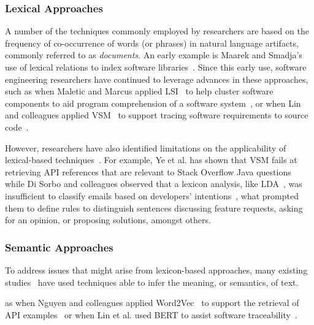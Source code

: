 \subsubsection{Lexical Approaches}


A number of the techniques commonly employed by researchers are based on the
frequency of co-occurrence of words (or phrases) in natural language artifacts, commonly referred to as \textit{documents}. 
An early example is Maarek and Smadja's use of lexical relations to index
software libraries~\cite{maarek1989}. 
Since this early use, software engineering
researchers have continued to leverage advances in
these approaches, such as when 
Maletic and Marcus applied \acf{LSI}~\cite{deerwester1990LSI} to help cluster software components to aid
program comprehension of a software system~\cite{Marcus2003}, or when Lin and colleagues
applied \acf{VSM}~\cite{salton1975vector}
to support tracing software requirements to source code~\cite{Lin2021}.



However, researchers have also identified limitations on the applicability of lexical-based techniques~\cite{silva2019, Ye2016, Sorbo2015}. For example, Ye et al. has shown that \acs{VSM} 
fails at retrieving API references that are relevant to Stack Overflow Java questions~\cite{Ye2016} while
Di Sorbo and colleagues observed that a lexicon analysis, like \acs{LDA}~\cite{blei2003latent}, was insufficient to classify emails based on developers' intentions~\cite{Sorbo2015}, what prompted them 
to define rules to
distinguish sentences discussing feature requests, asking for an
opinion, or proposing solutions, amongst others.



\subsubsection{Semantic Approaches}



To address issues that might arise from lexicon-based approaches,
many existing studies~\cite{silva2019, Huang2018, Ye2016, huang2018automating} have used techniques able to infer the meaning, or semantics, of text. 



 as  when Nguyen and colleagues
applied Word2Vec~\cite{Mikolov2013} to support the retrieval of API
examples~\cite{nguyen2017} or when Lin et al. used BERT to assist software traceability~\cite{Lin2021}.



